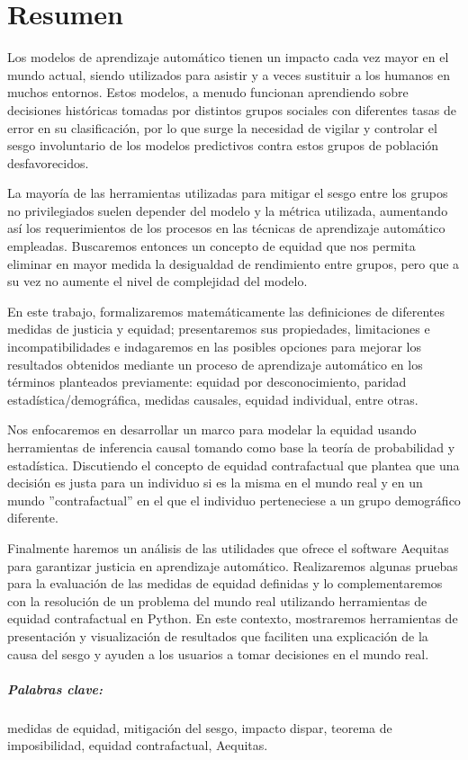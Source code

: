 \chapter*{Resumen}


Los modelos de aprendizaje automático tienen un impacto cada vez mayor en el mundo actual, siendo utilizados para asistir y a veces sustituir a los humanos en muchos entornos. Estos modelos, a menudo funcionan aprendiendo sobre decisiones históricas tomadas por distintos grupos sociales con diferentes tasas de error en su clasificación, por lo que surge la necesidad de vigilar y controlar el sesgo involuntario de los modelos predictivos contra estos
grupos de población desfavorecidos.

La mayoría de las herramientas utilizadas para mitigar el sesgo entre los grupos no privilegiados suelen depender del modelo y la métrica utilizada, aumentando así los requerimientos de los procesos en las técnicas de aprendizaje automático empleadas. Buscaremos entonces un concepto de equidad que nos permita eliminar en mayor medida la desigualdad de rendimiento entre grupos, pero que a su vez no aumente el nivel de complejidad del modelo.

En este trabajo, formalizaremos matemáticamente las definiciones de diferentes medidas de justicia y
equidad; presentaremos sus propiedades, limitaciones e incompatibilidades e indagaremos en las posibles opciones
para mejorar los resultados obtenidos mediante un proceso de aprendizaje automático en los
términos planteados previamente:
equidad por desconocimiento, paridad estadística/demográfica, medidas causales, equidad individual, entre otras.

Nos enfocaremos en desarrollar un marco para modelar la equidad usando herramientas de inferencia causal tomando como base la teoría de probabilidad y estadística. Discutiendo el concepto de equidad contrafactual que plantea que una decisión es justa para un individuo si es la misma en el mundo real y en un
mundo ''contrafactual'' en el que el individuo perteneciese a un grupo demográfico
diferente. 

Finalmente haremos un análisis de las utilidades que ofrece el software Aequitas para garantizar justicia en aprendizaje automático. Realizaremos algunas pruebas para la evaluación de las medidas de equidad definidas y lo complementaremos con la resolución de un problema del mundo real utilizando herramientas de equidad contrafactual en Python. En este contexto, mostraremos herramientas de presentación y visualización de resultados que faciliten una explicación de la causa del sesgo y ayuden a los usuarios a tomar decisiones en el mundo real.

\paragraph{Palabras clave:} medidas de equidad, mitigación del sesgo, impacto dispar, teorema de imposibilidad, equidad contrafactual, Aequitas.